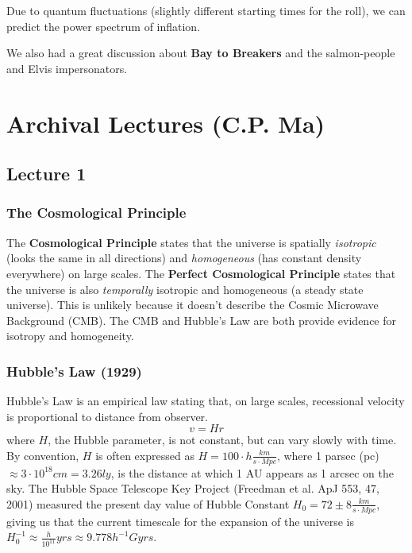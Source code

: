 \documentclass{article}
\begin{document}
Due to quantum fluctuations (slightly different starting times for the roll), we can predict the power spectrum of inflation. 

We also had a great discussion about \textbf{Bay to Breakers} and the salmon-people and Elvis impersonators. 













\appendix 

\section{Archival Lectures (C.P. Ma)}

\subsection{Lecture 1}

\subsubsection{ The Cosmological Principle}

The {\bf Cosmological Principle} states that the universe is spatially 
{\it isotropic} (looks the same in all directions) 
and {\it homogeneous} (has constant density everywhere) on large scales.
The {\bf Perfect Cosmological Principle} states that the universe is
also {\it temporally} isotropic and homogeneous (a steady state universe). 
This is unlikely because it doesn't describe the Cosmic Microwave Background
(CMB).  The CMB and Hubble's Law are both provide evidence for isotropy and
homogeneity.

\subsubsection{ Hubble's Law (1929) }

Hubble's Law is an empirical law stating that, on large scales, recessional 
velocity is proportional to distance from observer.
$$\boxed{v=Hr}$$ 
where $H$, the Hubble parameter, is not constant, but can
vary slowly with time.  By convention, $H$ is often expressed as
$H=100\cdot h\frac{km}{ s\cdot Mpc}$, where 1 parsec (pc) $\approx3\cdot10^{18}cm
=3.26ly$, is the distance at which 1 AU appears as 1 arcsec on the sky.  
The Hubble Space Telescope Key Project (Freedman et al. ApJ 553, 47, 2001)
measured the present day value of Hubble Constant 
$H_0=72\pm 8\frac{km}{ s\cdot Mpc}$, giving us that the current timescale for
the expansion of the universe is 
$H_0^{-1}\approx\frac{h}{ 10^{11}}yrs\approx 9.778h^{-1}Gyrs$.
\end{document}
